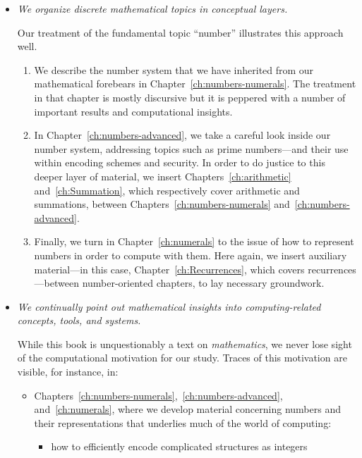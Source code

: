 \begin{itemize}
\medskip\item
{\em We organize discrete mathematical topics in conceptual layers.}

\smallskip

Our treatment of the fundamental topic ``number'' illustrates this approach well.
  \begin{enumerate}
  \item
We describe the number system that we have inherited from our mathematical forebears in Chapter~\ref{ch:numbers-numerals}.  The treatment in that chapter is mostly discursive but it is peppered with a number of important results and computational insights.
 \medskip \item
In Chapter~\ref{ch:numbers-advanced}, we take a careful look inside our number system, addressing topics such as prime numbers---and their use within encoding schemes and security.  In order to do justice to this deeper layer of material, we insert Chapters~\ref{ch:arithmetic} and~\ref{ch:Summation}, which respectively cover arithmetic and summations, between
Chapters~\ref{ch:numbers-numerals} and~\ref{ch:numbers-advanced}.
  \medskip\item
Finally, we turn in Chapter~\ref{ch:numerals} to the issue of how to represent numbers in order to compute with them.  Here again, we insert auxiliary material---in this case, Chapter~\ref{ch:Recurrences}, which covers recurrences---between number-oriented chapters, to lay necessary groundwork.
  \end{enumerate}

\item
{\em We continually point out mathematical insights into {\em computing-related} concepts, tools, and systems.}

\smallskip

While this book is unquestionably a text on {\em mathematics}, we never lose sight of the computational motivation for our study.  Traces of this motivation are visible, for instance, in:
  \begin{itemize}
  \item
Chapters~\ref{ch:numbers-numerals},~\ref{ch:numbers-advanced}, and~\ref{ch:numerals}, where we develop material concerning numbers and their representations that underlies much of the world of computing:
     \begin{itemize}
     \medskip\item
how to efficiently encode complicated structures as integers

\smallskip


\end{itemize}
\end{itemize}
\end{itemize}
